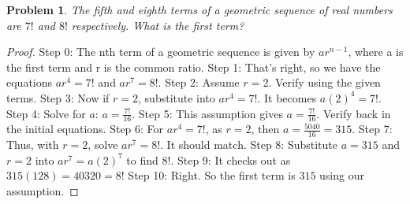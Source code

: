 \documentclass{article}
\newtheorem{theorem}{Problem}
\begin{document}
\begin{theorem}
The fifth and eighth terms of a geometric sequence of real numbers are $7!$ and $8!$ respectively. What is the first term?
\end{theorem}

\begin{proof}
Step 0: The nth term of a geometric sequence is given by $ar^{n-1}$, where a is the first term and r is the common ratio.
Step 1: That's right, so we have the equations $ar^4=7!$ and $ar^7=8!$.
Step 2: Assume $r = 2$. Verify using the given terms.
Step 3: Now if $r = 2$, substitute into $ar^4=7!$. It becomes $a(2)^4 = 7!$.
Step 4: Solve for $a$: $a = \frac{7!}{16}$.
Step 5: This assumption gives $a = \frac{7!}{16}$. Verify back in the initial equations.
Step 6: For $ar^4=7!$, as $r = 2$, then $a = \frac{5040}{16} = 315$.
Step 7: Thus, with $r = 2$, solve $ar^7=8!$. It should match.
Step 8: Substitute $a = 315$ and $r = 2$ into $ar^7 = a(2)^7$ to find $8!$.
Step 9: It checks out as $315(128) = 40320 = 8!$
Step 10: Right. So the first term is $315$ using our assumption.
\end{proof}
\end{document}
